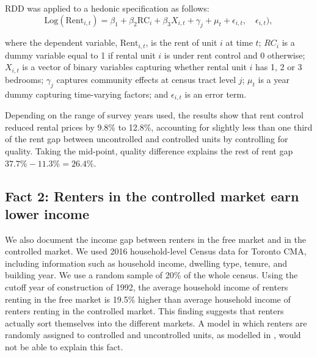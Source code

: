 \documentclass[parskip=full]{article}
\begin{document}
RDD was applied to a hedonic specification as follows: 
\begin{equation}\label{eq:RDD}
  \mbox{Log}(\mbox{Rent}_{i,t}) = \beta_{1} + \beta_{2}\mbox{RC}_{i}+\beta_{3}X_{i,t}+\gamma_{j}+\mu_{t}+\epsilon_{i,t}, \quad \epsilon_{i,t} ),
\end{equation}

\noindent where the dependent variable, $\mbox{Rent}_{i,t}$, is the rent of unit $i$ at time $t$; $RC_{i}$ is a dummy variable equal to 1 if rental unit $i$ is under rent control and 0 otherwise; $X_{i,t}$ is a vector of binary variables capturing whether rental unit $i$ has 1, 2 or 3 bedrooms; $\gamma_{j}$ captures community effects at census tract level $j$; $\mu_{t}$ is a year dummy capturing time-varying factors; and $\epsilon_{i,t}$ is an error term. 

Depending on the range of survey years used, the results show that rent control reduced rental prices by 9.8\% to 12.8\%, accounting for slightly less than one third of the rent gap between uncontrolled and controlled units by controlling for quality. Taking the mid-point, quality difference explains the rest of rent gap $37.7\%-11.3\%=26.4\%$. 


\subsection{Fact 2: Renters in the controlled market earn lower income} 

We also document the income gap between renters in the free market and in the controlled market. We used 2016 household-level Census data for Toronto CMA, including information such as household income, dwelling type, tenure, and building year. We use a random sample of 20\% of the whole census. Using the cutoff year of construction of 1992, the average household income of renters renting in the free market is 19.5\% higher than average household income of renters renting in the controlled market. This finding suggests that renters actually sort themselves into the different markets. A model in which renters are randomly assigned to controlled and uncontrolled units, as modelled in \citet{fmn-2022}, would not be able to explain this fact. 
\end{document}
